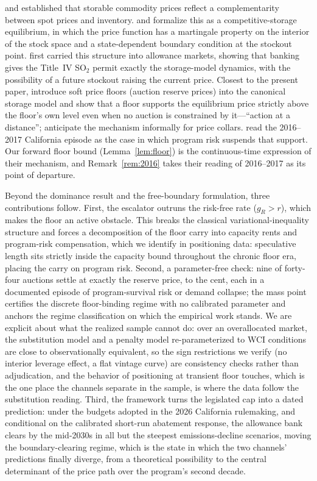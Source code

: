 \documentclass[11pt,letterpaper]{article}
\theoremstyle{plain}
\theoremstyle{definition}
\numberwithin{equation}{section}
\begin{document}
\citet{working1933, working1949} and \citet{brennan1958} established that storable commodity prices reflect a complementarity between spot prices and inventory. \citet{deaton1992, deaton1996} and \citet{routledge2000} formalize this as a competitive-storage equilibrium, in which the price function has a martingale property on the interior of the stock space and a state-dependent boundary condition at the stockout point. \citet{schennach2000} first carried this structure into allowance markets, showing that banking gives the Title~IV SO$_2$ permit exactly the storage-model dynamics, with the possibility of a future stockout raising the current price. Closest to the present paper, \citet{salant2022} introduce soft price floors (auction reserve prices) into the canonical storage model and show that a floor supports the equilibrium price strictly above the floor's own level even when no auction is constrained by it---``action at a distance''; \citet{burtraw2010} anticipate the mechanism informally for price collars. \citet{salant2022} read the 2016--2017 California episode as the case in which program risk suspends that support. Our forward floor bound (Lemma~\ref{lem:floor}) is the continuous-time expression of their mechanism, and Remark~\ref{rem:2016} takes their reading of 2016--2017 as its point of departure.

Beyond the dominance result and the free-boundary formulation, three contributions follow. First, the escalator outruns the risk-free rate ($g_R>r$), which makes the floor an active obstacle. This breaks the classical variational-inequality structure and forces a decomposition of the floor carry into capacity rents and program-risk compensation, which we identify in positioning data: speculative length sits strictly inside the capacity bound throughout the chronic floor era, placing the carry on program risk. Second, a parameter-free check: nine of forty-four auctions settle at exactly the reserve price, to the cent, each in a documented episode of program-survival risk or demand collapse; the mass point certifies the discrete floor-binding regime with no calibrated parameter and anchors the regime classification on which the empirical work stands. We are explicit about what the realized sample cannot do: over an overallocated market, the substitution model and a penalty model re-parameterized to WCI conditions are close to observationally equivalent, so the sign restrictions we verify (no interior leverage effect, a flat vintage curve) are consistency checks rather than adjudication, and the behavior of positioning at transient floor touches, which is the one place the channels separate in the sample, is where the data follow the substitution reading. Third, the framework turns the legislated cap into a dated prediction: under the budgets adopted in the 2026 California rulemaking, and conditional on the calibrated short-run abatement response, the allowance bank clears by the mid-2030s in all but the steepest emissions-decline scenarios, moving the boundary-clearing regime, which is  the state in which the two channels' predictions finally diverge, from a theoretical possibility to the central determinant of the price path over the program's second decade.
\end{document}
